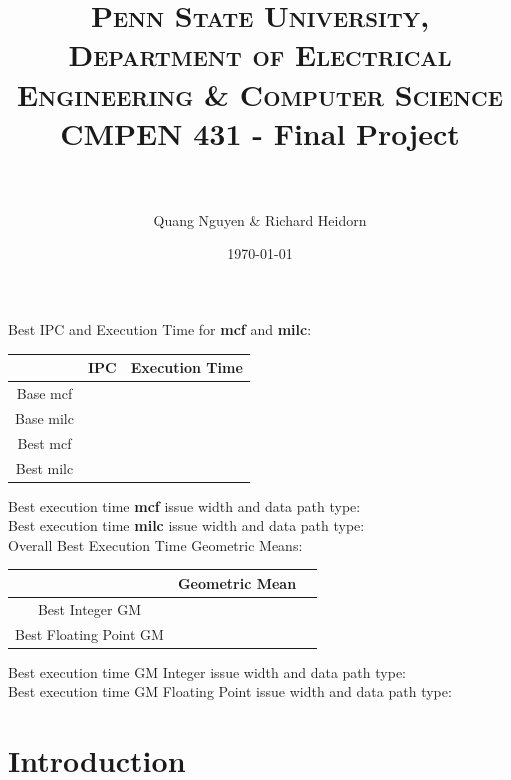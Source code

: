 \documentclass[paper=a4, fontsize=12pt]{scrartcl} %
\title{	
\normalfont \small 
\textsc{Penn State University, Department of Electrical Engineering \& Computer Science}
\horrule{0.5pt} \\[0.4cm] %
	\huge CMPEN 431 - Final Project \\ %
\horrule{2pt} \\[0.5cm] %
}
\author{Quang Nguyen \& Richard Heidorn}
\date{\normalsize \today}
\numberwithin{equation}{section} %
\numberwithin{figure}{section} %
\numberwithin{table}{section} %
\begin{document}
\maketitle %


Best IPC and Execution Time for \textbf{mcf} and \textbf{milc}:

\begin{center}
\begin{tabular}{ |c|c|c| } 
	\hline
	 & IPC & Execution Time \\ \hline
	Base mcf & & \\ \hline
	Base milc & & \\ \hline
	Best mcf & & \\ \hline
	Best milc & & \\ \hline
\end{tabular}
\end{center}

Best execution time \textbf{mcf} issue width and data path type: \\

Best execution time \textbf{milc} issue width and data path type: \\

Overall Best Execution Time Geometric Means:

\begin{center}
\begin{tabular}{ |c|c|c| } 
	\hline
	 & Geometric Mean \\ \hline
	Best Integer GM & \\ \hline
	Best Floating Point GM & \\ \hline
\end{tabular}
\end{center}

Best execution time GM Integer issue width and data path type: \\

Best execution time GM Floating Point issue width and data path type: \\


\newpage


\section{Introduction}
\end{document}
